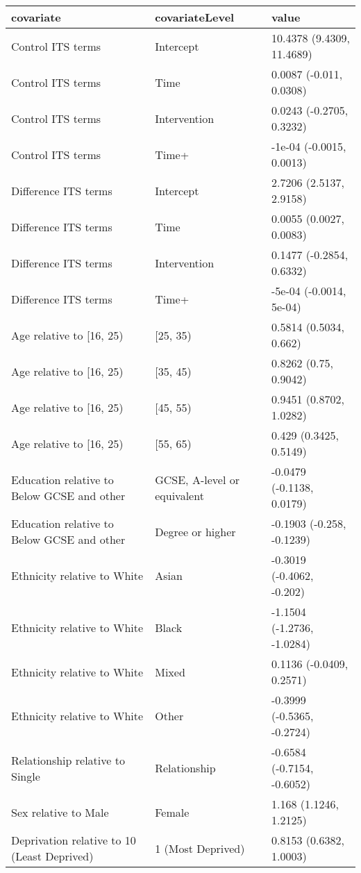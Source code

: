 \begin{table}[ht]
\centering
\begin{tabular}{lll}
  \hline
covariate & covariateLevel & value \\ 
  \hline
Control ITS terms & Intercept & 10.4378 (9.4309, 11.4689) \\ 
  Control ITS terms & Time & 0.0087 (-0.011, 0.0308) \\ 
  Control ITS terms & Intervention & 0.0243 (-0.2705, 0.3232) \\ 
  Control ITS terms & Time+ & -1e-04 (-0.0015, 0.0013) \\ 
  Difference ITS terms & Intercept & 2.7206 (2.5137, 2.9158) \\ 
  Difference ITS terms & Time & 0.0055 (0.0027, 0.0083) \\ 
  Difference ITS terms & Intervention & 0.1477 (-0.2854, 0.6332) \\ 
  Difference ITS terms & Time+ & -5e-04 (-0.0014, 5e-04) \\ 
  Age relative to [16, 25) & [25, 35) & 0.5814 (0.5034, 0.662) \\ 
  Age relative to [16, 25) & [35, 45) & 0.8262 (0.75, 0.9042) \\ 
  Age relative to [16, 25) & [45, 55) & 0.9451 (0.8702, 1.0282) \\ 
  Age relative to [16, 25) & [55, 65) & 0.429 (0.3425, 0.5149) \\ 
  Education relative to Below GCSE and other & GCSE, A-level or equivalent & -0.0479 (-0.1138, 0.0179) \\ 
  Education relative to Below GCSE and other & Degree or higher & -0.1903 (-0.258, -0.1239) \\ 
  Ethnicity relative to White & Asian & -0.3019 (-0.4062, -0.202) \\ 
  Ethnicity relative to White & Black & -1.1504 (-1.2736, -1.0284) \\ 
  Ethnicity relative to White & Mixed & 0.1136 (-0.0409, 0.2571) \\ 
  Ethnicity relative to White & Other & -0.3999 (-0.5365, -0.2724) \\ 
  Relationship relative to Single & Relationship & -0.6584 (-0.7154, -0.6052) \\ 
  Sex relative to Male & Female & 1.168 (1.1246, 1.2125) \\ 
  Deprivation relative to 10 (Least Deprived) & 1 (Most Deprived) & 0.8153 (0.6382, 1.0003) \\ 

\end{tabular}
\end{table}
